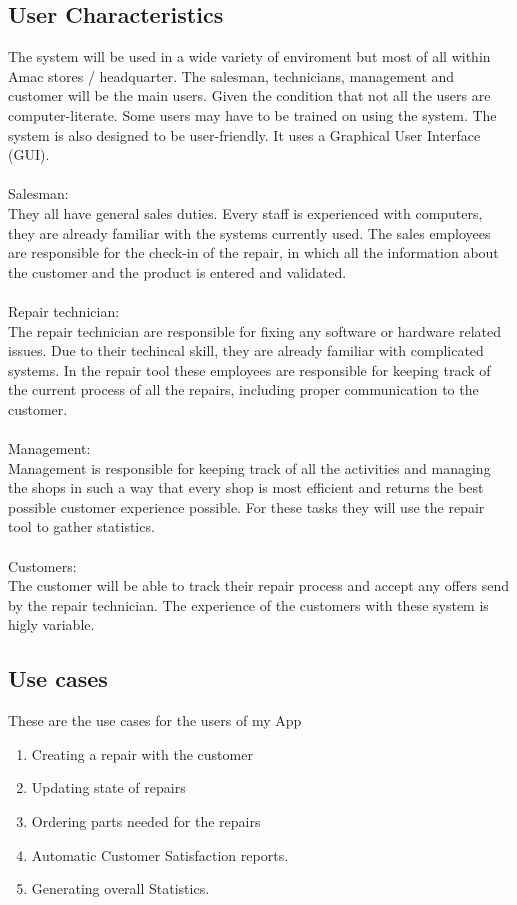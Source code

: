 \documentclass{article}
\begin{document}
\subsection{User Characteristics}
The system will be used in a wide variety of enviroment but most of all within Amac stores / headquarter.  The salesman, technicians, management and customer will be the main users. Given the condition that not all the users are computer-literate. Some users may have to be trained on using the system. The system is also designed to be user-friendly. It uses a Graphical User Interface (GUI). \\
\\
Salesman:\\ 
They all have general sales duties. Every staff is experienced with computers, they are already familiar with the systems currently used. The sales employees are responsible for the check-in of the repair, in which all the information about the customer and the product is entered and validated. \\
\\
Repair technician:\\
The repair technician are responsible for fixing any software or hardware related issues. Due to their techincal skill, they are already familiar with complicated systems. In the repair tool these employees are responsible for keeping track of the current process of all the repairs, including proper communication to the customer.\\
\\
Management:\\
Management is responsible for keeping track of all the activities and managing the shops in such a way that every shop is most efficient and returns the best possible customer experience possible. For these tasks they will use the repair tool to gather statistics. \\
\\
Customers:\\
The customer will be able to track their repair process and accept any offers send by the repair technician. The experience of the customers with these system is higly variable. \\


\subsection{Use cases}
These are the use cases for the users of my App
\begin{enumerate}
    \item Creating a repair with the customer
    \item Updating state of repairs
    \item Ordering parts needed for the repairs
    \item Automatic Customer Satisfaction reports.
    \item Generating overall Statistics.
\end{enumerate}
\end{document}
